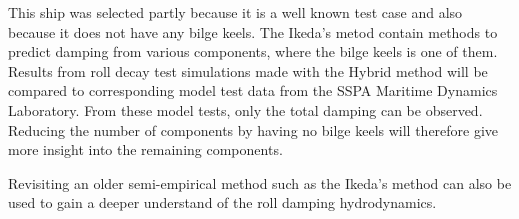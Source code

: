     

    This ship was selected partly because it is a well known test case and
also because it does not have any bilge keels. The Ikeda's metod contain
methods to predict damping from various components, where the bilge
keels is one of them. Results from roll decay test simulations made with
the Hybrid method will be compared to corresponding model test data from
the SSPA Maritime Dynamics Laboratory. From these model tests, only the
total damping can be observed. Reducing the number of components by
having no bilge keels will therefore give more insight into the
remaining components.

Revisiting an older semi-empirical method such as the Ikeda's method can
also be used to gain a deeper understand of the roll damping
hydrodynamics.

    